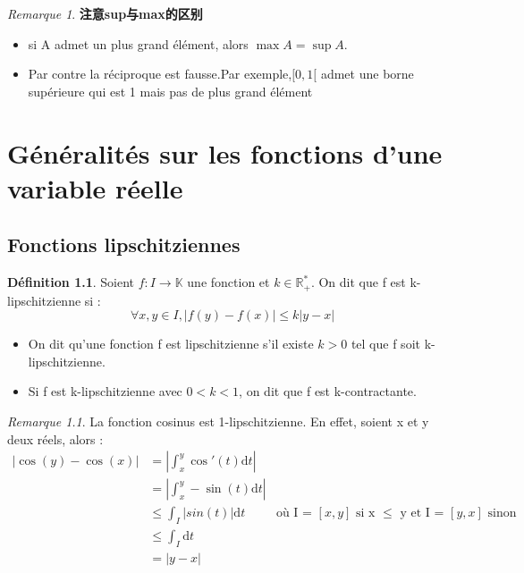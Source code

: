 \documentclass[12pt]{book}
\theoremstyle{definition}\newtheorem{dfn}{Définition}[chapter]
\theoremstyle{plain}\newtheorem{thm}{Théorème}[chapter]
\theoremstyle{plain}\newtheorem{prp}{Proposition}[chapter]
\theoremstyle{plain}\newtheorem{lem}{\bf Lemme}[chapter]
\theoremstyle{plain}\newtheorem{axm}{\bf Axiome}[chapter]
\theoremstyle{plain}\newtheorem{lmm}{\bf Lemme}[chapter]
\theoremstyle{plain}\newtheorem{cor}{\bf Corollaire}[chapter]
\theoremstyle{remark}\newtheorem{rem}{Remarque}[chapter]
\begin{document}
\begin{rem}
\textbf{注意sup与max的区别}
\begin{itemize}
\item si A admet un plus grand élément, alors $\max A=\sup A$.
\item Par contre la réciproque est fausse.Par exemple,$[0,1[$ admet une borne supérieure qui est 1 mais pas de plus grand élément
\end{itemize}
\end{rem}



\chapter{Généralités sur les fonctions d'une variable réelle}


\section{Fonctions lipschitziennes}



\begin{dfn}
Soient $f : I \rightarrow \mathbb{K}$ une fonction et $k \in \mathbb{R_{+}^{*}}$. On dit que f est k-lipschitzienne si :
$$\forall x,y \in I ,\left |   f(y)- f(x)\right | \le k \left |   y- x\right |
$$
\begin{itemize}

\item On dit qu'une fonction f est lipschitzienne s'il existe $k > 0$ tel que f soit k-lipschitzienne.
\item Si f est k-lipschitzienne avec $0 < k < 1$, on dit que f est k-{\color{red}contractante}.

\end{itemize}


\end{dfn}

\begin{rem}
La fonction cosinus est 1-lipschitzienne. En effet, soient x et y deux réels, alors :
$$
\begin{aligned}
\left|   \cos(y)-\cos(x)   \right| &=\left|\int_{x}^{y}\cos'(t)\mathrm{d}t \right|\\
&=\left|\int_{x}^{y}-\sin(t)\mathrm{d}t \right|\\
&\le\int_{I}\left|sin(t)\right|\mathrm{d}t&\text{où I = $\left[x, y\right]$ si x $\le$ y et I = $\left[y, x\right]$ sinon}\\
&\le\int_{I}\mathrm{d}t\\
&=\left| y-x \right|\\
\end{aligned}
$$
\end{rem}
\end{document}
